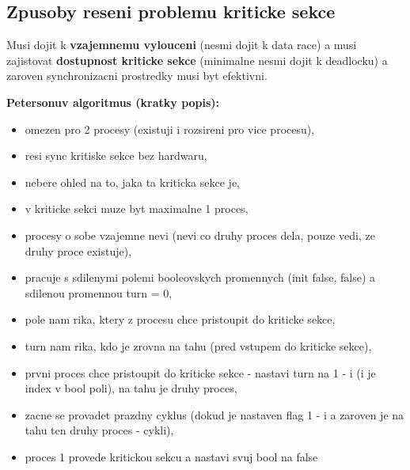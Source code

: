 \documentclass[a4paper, 11pt]{article}
\begin{document}
\subsection{Zpusoby reseni problemu kriticke sekce}
Musi dojit k \textbf{vzajemnemu vylouceni} (nesmi dojit k data race) a musi zajistovat \textbf{dostupnost kriticke sekce} (minimalne nesmi dojit k deadlocku) a zaroven synchronizacni prostredky musi byt efektivni.

\textbf{Petersonuv algoritmus (kratky popis):}
\begin{itemize}
    \item omezen pro 2 procesy (existuji i rozsireni pro vice procesu),
    \item resi sync kritiske sekce bez hardwaru,
    \item nebere ohled na to, jaka ta kriticka sekce je,
    \item v kriticke sekci muze byt maximalne 1 proces,
    \item procesy o sobe vzajemne nevi (nevi co druhy proces dela, pouze vedi, ze druhy proce existuje),
    \item pracuje s sdilenymi polemi booleovskych promennych (init false, false) a sdilenou promennou turn = 0,
    \item pole nam rika, ktery z procesu chce pristoupit do kriticke sekce,
    \item turn nam rika, kdo je zrovna na tahu (pred vstupem do kriticke sekce),
    \item prvni proces chce pristoupit do kriticke sekce - nastavi turn na 1 - i (i je index v bool poli), na tahu je druhy proces,
    \item zacne se provadet prazdny cyklus (dokud je nastaven flag 1 - i a zaroven je na tahu ten druhy proces - cykli),
    \item proces 1 provede kritickou sekcu a nastavi svuj bool na false \\
\end{itemize}
\end{document}
